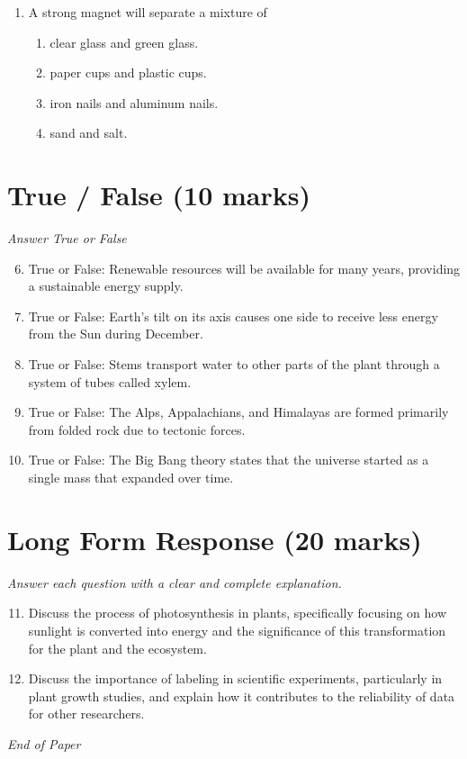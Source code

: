 \documentclass[12pt]{article}
\begin{document}
\begin{enumerate}[label=\arabic*.]
\begin{enumerate}[label=(\alph*)]
    \item fruits
    \item grains
    \item cheese
    \item vegetables
\end{enumerate}
\item A strong magnet will separate a mixture of
\begin{enumerate}[label=(\alph*)]
    \item clear glass and green glass.
    \item paper cups and plastic cups.
    \item iron nails and aluminum nails.
    \item sand and salt.
\end{enumerate}
\end{enumerate}

\section*{True / False (10 marks)}
\textit{Answer True or False}
\begin{enumerate}[label=\arabic*.]
\setcounter{enumi}{5}
\item True or False: Renewable resources will be available for many years, providing a sustainable energy supply.
\item True or False: Earth's tilt on its axis causes one side to receive less energy from the Sun during December.
\item True or False: Stems transport water to other parts of the plant through a system of tubes called xylem.
\item True or False: The Alps, Appalachians, and Himalayas are formed primarily from folded rock due to tectonic forces.
\item True or False: The Big Bang theory states that the universe started as a single mass that expanded over time.
\end{enumerate}

\section*{Long Form Response (20 marks)}
\textit{Answer each question with a clear and complete explanation.}
\begin{enumerate}[label=\arabic*.]
\setcounter{enumi}{10}
\item Discuss the process of photosynthesis in plants, specifically focusing on how sunlight is converted into energy and the significance of this transformation for the plant and the ecosystem.
\item Discuss the importance of labeling in scientific experiments, particularly in plant growth studies, and explain how it contributes to the reliability of data for other researchers.
\end{enumerate}

\vfill
\noindent\textit{End of Paper}
\end{document}
